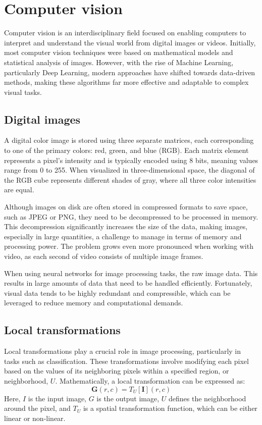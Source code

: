 \section{Computer vision}

Computer vision is an interdisciplinary field focused on enabling computers to interpret and understand the visual world from digital images or videos. 
Initially, most computer vision techniques were based on mathematical models and statistical analysis of images.
However, with the rise of Machine Learning, particularly Deep Learning, modern approaches have shifted towards data-driven methods, making these algorithms far more effective and adaptable to complex visual tasks.

\subsection{Digital images}
A digital color image is stored using three separate matrices, each corresponding to one of the primary colors: red, green, and blue (RGB). 
Each matrix element represents a pixel's intensity and is typically encoded using 8 bits, meaning values range from 0 to 255.
When visualized in three-dimensional space, the diagonal of the RGB cube represents different shades of gray, where all three color intensities are equal.

Although images on disk are often stored in compressed formats to save space, such as JPEG or PNG, they need to be decompressed to be processed in memory. 
This decompression significantly increases the size of the data, making images, especially in large quantities, a challenge to manage in terms of memory and processing power. 
The problem grows even more pronounced when working with video, as each second of video consists of multiple image frames.

When using neural networks for image processing tasks, the raw image data. 
This results in large amounts of data that need to be handled efficiently. 
Fortunately, visual data tends to be highly redundant and compressible, which can be leveraged to reduce memory and computational demands.

\subsection{Local transformations}
Local transformations play a crucial role in image processing, particularly in tasks such as classification.
These transformations involve modifying each pixel based on the values of its neighboring pixels within a specified region, or neighborhood, $U$. 
Mathematically, a local transformation can be expressed as:
\[\mathbf{G}(r,c)=T_U[\mathbf{I}](r,c)\]
Here, $I$ is the input image, $G$ is the output image, $U$ defines the neighborhood around the pixel, and $T_U$ is a spatial transformation function, which can be either linear or non-linear.

